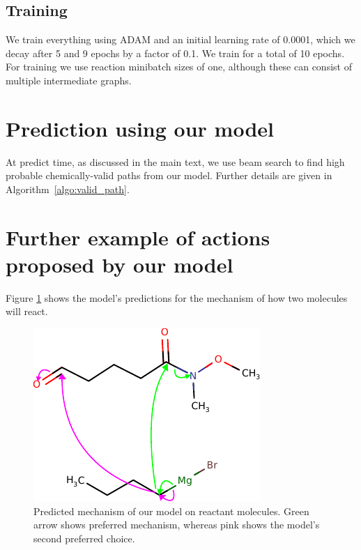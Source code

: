 \documentclass{article}
\begin{document}
\subsection{Training}

We train everything using ADAM \citep{kingma2014adam} and an initial learning rate of 0.0001, which we decay after 5 and 9 epochs by a factor of 0.1. 
We train for a total of 10 epochs.
For training we use reaction minibatch sizes of one, although these can consist of multiple intermediate graphs.









\section{Prediction using our model}

At predict time, as discussed in the main text, we use beam search to find high probable chemically-valid paths from our model. Further details are given in Algorithm~\ref{algo:valid_path}.



\section{Further example of actions proposed by our model}

Figure \ref{fig:extra-textbook-example} shows the model's predictions for the mechanism of how two molecules will react.

\begin{figure}[h]
        \centering
        \includegraphics{imgs/textbook/reactants2}
        \caption{Predicted mechanism of our model on reactant molecules. Green arrow shows preferred mechanism, whereas pink shows the model's second preferred choice.}
        \label{fig:extra-textbook-example}
\end{figure}




\end{document}

